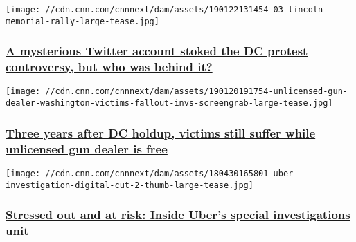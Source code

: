 \href{/2019/01/23/tech/twitter-account-covington-protest/index.html}{}

\texttt{[image: //cdn.cnn.com/cnnnext/dam/assets/190122131454-03-lincoln-memorial-rally-large-tease.jpg]}

\hypertarget{a-mysterious-twitter-account-stoked-the-dc-protest-controversy-but-who-was-behind-it}{%
\subsubsection{\texorpdfstring{\href{/2019/01/23/tech/twitter-account-covington-protest/index.html}{A
mysterious Twitter account stoked the DC protest controversy, but who
was behind
it?}}{A mysterious Twitter account stoked the DC protest controversy, but who was behind it?}}\label{a-mysterious-twitter-account-stoked-the-dc-protest-controversy-but-who-was-behind-it}}

\href{/2019/01/21/us/unlicensed-gun-dealing-washington-holdup-victims-invs/index.html}{}

\texttt{[image: //cdn.cnn.com/cnnnext/dam/assets/190120191754-unlicensed-gun-dealer-washington-victims-fallout-invs-screengrab-large-tease.jpg]}

\hypertarget{three-years-after-dc-holdup-victims-still-suffer-while-unlicensed-gun-dealer-is-free-}{%
\subsubsection{\texorpdfstring{\href{/2019/01/21/us/unlicensed-gun-dealing-washington-holdup-victims-invs/index.html}{Three
years after DC holdup, victims still suffer while unlicensed gun dealer
is free
}}{Three years after DC holdup, victims still suffer while unlicensed gun dealer is free }}\label{three-years-after-dc-holdup-victims-still-suffer-while-unlicensed-gun-dealer-is-free-}}

\href{/2019/01/21/tech/uber-investigations-unit-report/index.html}{}

\texttt{[image: //cdn.cnn.com/cnnnext/dam/assets/180430165801-uber-investigation-digital-cut-2-thumb-large-tease.jpg]}

\hypertarget{stressed-out-and-at-risk-inside-ubers-special-investigations-unit-1}{%
\subsubsection{\texorpdfstring{\href{/2019/01/21/tech/uber-investigations-unit-report/index.html}{Stressed
out and at risk: Inside Uber's special investigations
unit}}{Stressed out and at risk: Inside Uber's special investigations unit}}\label{stressed-out-and-at-risk-inside-ubers-special-investigations-unit-1}}

